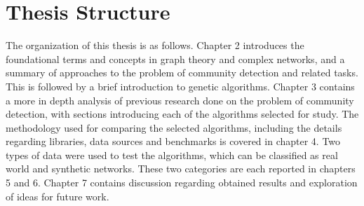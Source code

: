 \section{Thesis Structure}
The organization of this thesis is as follows. Chapter 2 introduces the foundational terms and concepts in graph theory and complex networks, and a summary of approaches to the problem of community detection and related tasks. This is followed by a brief introduction to genetic algorithms. Chapter 3 contains a more in depth analysis of previous research done on the problem of community detection, with sections introducing each of the algorithms selected for study. The methodology used for comparing the selected algorithms, including the details regarding libraries, data sources and benchmarks is covered in chapter 4. Two types of data were used to test the algorithms, which can be classified as real world and synthetic networks. These two categories are each reported in chapters 5 and 6. Chapter 7 contains discussion regarding obtained results and exploration of ideas for future work.